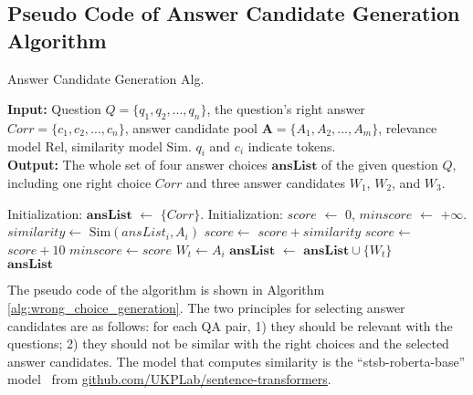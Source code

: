 \documentclass[11pt]{article}
\begin{document}
\subsection{Pseudo Code of Answer Candidate Generation Algorithm}
\begin{algorithm}[H]
    \small
    \caption{Answer Candidate Generation Alg.}
    \textbf{Input:} Question $Q = \{q_1, q_2, ..., q_n\}$, the question's right answer $Corr = \{c_1, c_2, ..., c_n\}$, answer candidate pool $\mathbf{A} = \{A_1, A_2, ..., A_m\}$, relevance model $\mathrm{Rel}$, similarity model $\mathrm{Sim}$. $q_i$ and $c_i$ indicate tokens. \\
    \textbf{Output:} The whole set of four answer choices $\mathbf{ansList}$ of the given question $Q$, including one right choice $Corr$ and three answer candidates $W_1$, $W_2$, and $W_3$. 
    \begin{algorithmic}[1]
     \State Initialization: $\mathbf{ansList}$ $\gets$ $\{Corr\}$.
            \State Initialization: $score$ $\gets$ $0$, $minscore$ $\gets$ $+\infty$.
                    \State $similarity \gets$ $\mathrm{Sim}({ansList}_i,A_i)$
                        \State $score \gets$ $score+similarity$
                    \Else
                        \State $score \gets$ $score+10$
                    \EndIf
                \EndFor
                    \State $minscore \gets score$
                    \State $W_t \gets A_i$
                \EndIf
            \EndIf
        \EndFor
        \State $\mathbf{ansList}$ $\gets$ $\mathbf{ansList} \cup \{W_t\}$
     \EndFor \\
     \Return $\mathbf{ansList}$
    \end{algorithmic}
    \label{alg:wrong_choice_generation}
\end{algorithm}
\label{appendix:wrong_choice}
The pseudo code of the algorithm is shown in Algorithm \ref{alg:wrong_choice_generation}. The two principles for selecting answer candidates are as follows: for each QA pair, 1) they should be relevant with the questions; 2) they should not be similar with the right choices and the selected answer candidates. The model that computes similarity is the ``stsb-roberta-base'' model~\cite{reimers-2019-sentence-bert} from \url{github.com/UKPLab/sentence-transformers}.
\end{document}
